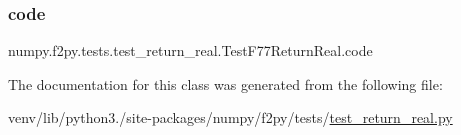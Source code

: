 \subsubsection{\texorpdfstring{code}{code}}
{\footnotesize\ttfamily numpy.\+f2py.\+tests.\+test\+\_\+return\+\_\+real.\+Test\+F77\+Return\+Real.\+code\hspace{0.3cm}{\ttfamily [static]}}



The documentation for this class was generated from the following file\+:\begin{DoxyCompactItemize}
\item 
venv/lib/python3./site-\/packages/numpy/f2py/tests/\hyperlink{test__return__real_8py}{test\+\_\+return\+\_\+real.\+py}\end{DoxyCompactItemize}
